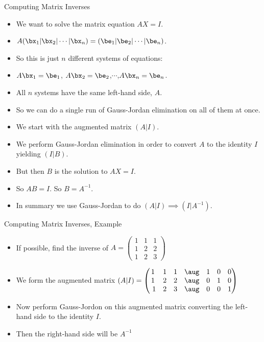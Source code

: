 \documentclass{beamer}
\begin{document}
\begin{frame}{Computing Matrix Inverses}

\begin{itemize}
\item We want to solve the matrix equation $AX = I$.
\item $A(\bx_1 \vert \bx_2 \vert \cdots \vert \bx_n) = (\be_1 \vert \be_2 \vert \cdots \vert \be_n)$.
\item So this is just $n$ different systems of equations:
\item $A\bx_1 = \be_1$, $A\bx_2=\be_2$,$\cdots$,$A\bx_n=\be_n$.
\item All $n$ systems have the same left-hand side, $A$.
\item So we can do a single run of Gauss-Jordan elimination on all of them at once.
\item We start with the augmented matrix $(A\vert I)$.
\item We perform Gauss-Jordan elimination in order to convert $A$ to the identity $I$ yielding
$(I \vert B)$.
\item But then $B$ is the solution to $AX=I$.
\item So $AB=I$. So $B=A^{-1}$.
\item In summary we use Gauss-Jordan to do $(A\vert I) \implies (I \vert A^{-1})$.
\end{itemize}

\end{frame}


\begin{frame}{Computing Matrix Inverses, Example}

\begin{itemize}
\item If possible, find the inverse of
$A=
\begin{pmatrix}
1 & 1 & 1 \\
1 & 2 & 2 \\
1 & 2 & 3
\end{pmatrix}
$
\item We form the augmented matrix
$ (A\vert I) =
\begin{pmatrix}
1 & 1 & 1 & \aug & 1 & 0 & 0\\
1 & 2 & 2 & \aug & 0 & 1 & 0\\\
1 & 2 & 3 & \aug & 0 & 0 & 1
\end{pmatrix}
$
\item Now perform Gauss-Jordon on this augmented matrix converting
the left-hand side to the identity $I$.
\item Then the right-hand side will be $A^{-1}$
\end{itemize}

\end{frame}
\end{document}
